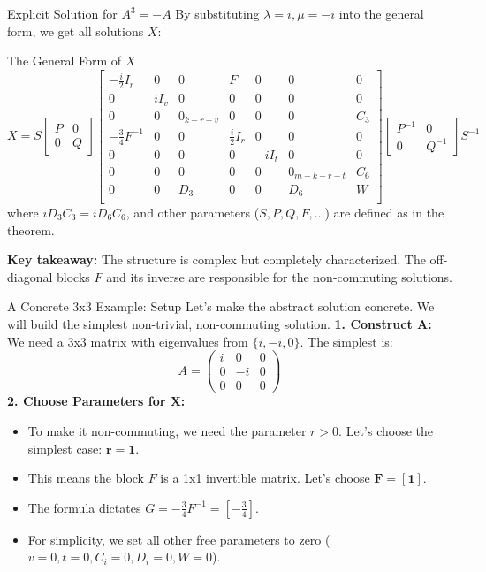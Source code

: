 \documentclass{beamer}
\begin{document}
\begin{frame}{Explicit Solution for $A^3 = -A$}
  By substituting $\lambda=i, \mu=-i$ into the general form, we get all solutions $X$:
  \begin{block}{The General Form of $X$}
  \footnotesize
  \[X = S \begin{bmatrix} P & 0 \\ 0 & Q \end{bmatrix} \left[ \begin{array}{ccc|ccc|c} - \frac{i}{2} I_r & 0 & 0 & F & 0 & 0 & 0 \\ 0 & i I_v & 0 & 0 & 0 & 0 & 0 \\ 0 & 0 & 0_{k-r-v} & 0 & 0 & 0 & C_3 \\ \hline - \frac{3}{4} F^{-1} & 0 & 0 & \frac{i}{2} I_r & 0 & 0 & 0 \\ 0 & 0 & 0 & 0 & -i I_t & 0 & 0 \\ 0 & 0 & 0 & 0 & 0 & 0_{m-k-r-t} & C_6 \\ \hline 0 & 0 & D_3 & 0 & 0 & D_6 & W \\ \end{array} \right] \begin{bmatrix} P^{-1} & 0 \\ 0 & Q^{-1} \end{bmatrix} S^{-1}\]
  where $i D_3 C_3 = i D_6 C_6$, and other parameters ($S, P, Q, F, \dots$) are defined as in the theorem.
  \end{block}
  \normalsize %
  \vfill
  \textbf{Key takeaway:} The structure is complex but completely characterized. The off-diagonal blocks $F$ and its inverse are responsible for the non-commuting solutions.
\end{frame}

\begin{frame}{A Concrete 3x3 Example: Setup}
  Let's make the abstract solution concrete. We will build the simplest non-trivial, non-commuting solution.
  \vfill
  \textbf{1. Construct A:} We need a 3x3 matrix with eigenvalues from $\{i, -i, 0\}$. The simplest is:
  \[ A = \begin{pmatrix} i & 0 & 0 \\ 0 & -i & 0 \\ 0 & 0 & 0 \end{pmatrix} \]
  \vfill
  \textbf{2. Choose Parameters for X:}
  \begin{itemize}
    \item To make it non-commuting, we need the parameter $r > 0$. Let's choose the simplest case: $\mathbf{r=1}$.
    \item This means the block $F$ is a 1x1 invertible matrix. Let's choose $\mathbf{F = [1]}$.
    \item The formula dictates $G = -\frac{3}{4}F^{-1} = [-\frac{3}{4}]$.
    \item For simplicity, we set all other free parameters to zero ($v=0, t=0, C_i=0, D_i=0, W=0$).
  \end{itemize}
\end{frame}
\end{document}
